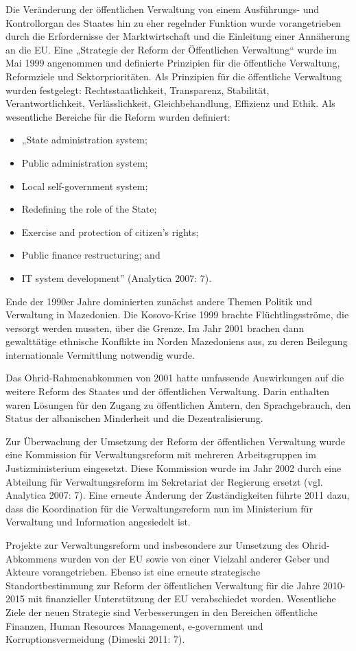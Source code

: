 Die Veränderung der öffentlichen Verwaltung von einem Ausführungs- und Kontrollorgan des Staates hin zu eher regelnder Funktion wurde vorangetrieben durch die Erfordernisse der Marktwirtschaft und die Einleitung einer Annäherung an die EU. Eine „Strategie der Reform der Öffentlichen Verwaltung“ wurde im Mai 1999 angenommen und definierte Prinzipien für die öffentliche Verwaltung, Reformziele und Sektorprioritäten. Als Prinzipien für die öffentliche Verwaltung wurden festgelegt: Rechtsstaatlichkeit, Transparenz, Stabilität, Verantwortlichkeit, Verlässlichkeit, Gleichbehandlung, Effizienz und Ethik.
Als wesentliche Bereiche für die Reform wurden definiert:
\begin{itemize}
\item „State administration system;
\item Public administration system;
\item Local self-government system;
\item Redefining the role of the State;
\item Exercise and protection of citizen’s rights;
\item Public finance restructuring; and
\item IT system development” (Analytica 2007: 7).
\end{itemize}
Ende der 1990er Jahre dominierten zunächst andere Themen Politik und Verwaltung in Mazedonien. Die Kosovo-Krise 1999 brachte Flüchtlingsströme, die versorgt werden mussten, über die Grenze. Im Jahr 2001 brachen dann gewalttätige ethnische Konflikte im Norden Mazedoniens aus, zu deren Beilegung internationale Vermittlung notwendig wurde. \par
Das Ohrid-Rahmenabkommen von 2001 hatte umfassende Auswirkungen auf die weitere Reform des Staates und der öffentlichen Verwaltung. Darin enthalten waren Lösungen für den Zugang zu öffentlichen Ämtern, den Sprachgebrauch, den Status der albanischen Minderheit und die Dezentralisierung.\par
Zur Überwachung der Umsetzung der Reform der öffentlichen Verwaltung wurde eine Kommission für Verwaltungsreform mit mehreren Arbeitsgruppen im Justizministerium eingesetzt. Diese Kommission wurde im Jahr 2002 durch eine Abteilung für Verwaltungsreform im Sekretariat der Regierung ersetzt (vgl. Analytica 2007: 7). Eine erneute Änderung der Zuständigkeiten führte 2011 dazu, dass die Koordination für die Verwaltungsreform nun im Ministerium für Verwaltung und Information angesiedelt ist.\par
Projekte zur Verwaltungsreform und insbesondere zur Umsetzung des Ohrid-Abkommens wurden von der EU sowie von einer Vielzahl anderer Geber und Akteure vorangetrieben. Ebenso ist eine erneute strategische Standortbestimmung zur Reform der öffentlichen Verwaltung für die Jahre 2010-2015 mit finanzieller Unterstützung der EU verabschiedet worden. Wesentliche Ziele der neuen Strategie sind Verbesserungen in den Bereichen öffentliche Finanzen, Human Resources Management, e-government und Korruptionsvermeidung (Dimeski 2011: 7). \par
